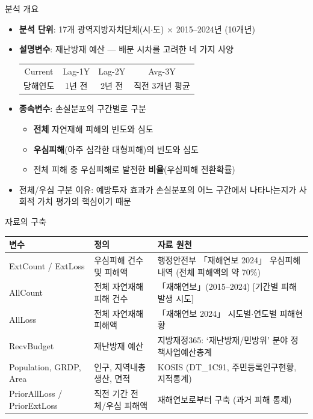 \documentclass[aspectratio=169,10pt]{beamer}
\begin{document}
\begin{frame}{분석 개요}
  \begin{itemize}
    \item \textbf{분석 단위}: 17개 광역지방자치단체(시$\cdot$도) $\times$ 2015--2024년 (10개년)
    \item \textbf{설명변수}: 재난방재 예산 --- 배분 시차를 고려한 네 가지 사양
    \begin{center}\small
      \begin{tabular}{cccc}
        \toprule
        Current & Lag-1Y & Lag-2Y & Avg-3Y \\
        당해연도 & 1년 전 & 2년 전 & 직전 3개년 평균 \\
        \bottomrule
      \end{tabular}
    \end{center}
    \item \textbf{종속변수}: 손실분포의 구간별로 구분
    \begin{itemize}
      \item \textbf{전체} 자연재해 피해의 빈도와 심도
      \item \textbf{우심피해}(아주 심각한 대형피해)의 빈도와 심도
      \item 전체 피해 중 우심피해로 발전한 \textbf{비율}(우심피해 전환확률)
    \end{itemize}
    \item 전체/우심 구분 이유: 예방투자 효과가 \alert{손실분포의 어느 구간}에서 나타나는지가 사회적 가치 평가의 핵심이기 때문
  \end{itemize}
\end{frame}

\begin{frame}{자료의 구축}
  \scriptsize
  \begin{tabularx}{\textwidth}{@{}l l Y@{}}
    \toprule
    변수 & 정의 & 자료 원천 \\
    \midrule
    ExtCount / ExtLoss & 우심피해 건수 및 피해액 & 행정안전부 「재해연보 2024」 우심피해 내역 (전체 피해액의 약 70\%) \\
    AllCount & 전체 자연재해 피해 건수 & 「재해연보」(2015--2024) [기간별 피해발생 시도] \\
    AllLoss & 전체 자연재해 피해액 & 「재해연보 2024」 시도별$\cdot$연도별 피해현황 \\
    RecvBudget & 재난방재 예산 & 지방재정365: `재난방재/민방위' 분야 정책사업예산총계 \\
    Population, GRDP, Area & 인구, 지역내총생산, 면적 & KOSIS (DT\_1C91, 주민등록인구현황, 지적통계) \\
    PriorAllLoss / PriorExtLoss & 직전 기간 전체/우심 피해액 & 재해연보로부터 구축 (과거 피해 통제) \\
    \bottomrule
  \end{tabularx}
\end{frame}
\end{document}
